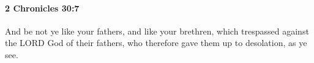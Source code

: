 
		\paragraph{2 Chronicles 30:7} %
			\label{2CHRONICLES-30-7}

			And be not ye like your fathers, and like your brethren, which trespassed against the LORD God of their fathers, who therefore gave them up to desolation, as ye see.


